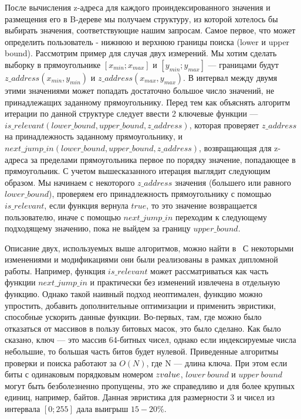 После вычисления z-адреса для каждого проиндексированного значения и размещения его в B-дереве мы получаем структуру, из которой хотелось бы выбирать значения, соответствующие нашим запросам. Самое первое, что может определить пользователь - нижнюю и верхнюю границы поиска (lower и upper bound). Рассмотрим пример для случая двух измерений. Мы хотим сделать выборку в прямоугольнике $[x_{min};x_{max}]$ и $[y_{min}; y_{max}]$ --- границами будут $z\_address(x_{min}, y_{min})$ и $z\_address(x_{max}, y_{max})$. В интервал между двумя этими значениями может попадать достаточно большое число значений, не принадлежащих заданному прямоугольнику. Перед тем как объяснять алгоритм итерации по данной структуре следует ввести 2 ключевые функции --- $is\_relevant(lower\_bound, upper\_bound, z\_address)$, которая проверяет $z\_address$ на принадлежность заданному прямоугольнику, и $next\_jump\_in(lower\_bound, upper\_bound, z\_address)$, возвращающая для z-адреса за пределами прямоугольника первое по порядку значение, попадающее в прямоугольник.
С учетом вышесказанного итерация выглядит следующим образом. Мы начинаем с некоторого $z\_address$ значения (большего или равного $lower\_bound$), проверяем его принадлежность прямоугольнику с помощью  $is\_relevant$, если функция вернула $true$, то это значение возвращается пользователю, иначе с помощью $next\_jump\_in$ переходим к следующему подходящему значению, пока не выйдем за границу $upper\_bound$.

Описание двух, используемых выше алгоритмов, можно найти в~\cite{ramsak2000integrating, widhopf2005advanced, prukl2007relavcni} С некоторыми изменениями и модификациями они были реализованы в рамках дипломной работы. Например, функция $is\_relevant$ может рассматриваться как часть функции $next\_jump\_in$ и практически без изменений извлечена в отдельную функцию. Однако такой наивный подход неоптимален, функцию можно упростить, добавить дополнительные оптимизации и применить эвристики, способные ускорить данные функции.
Во-первых, там, где можно было отказаться от массивов в пользу битовых масок, это было сделано.
Как было сказано, ключ --- это массив 64-битных чисел, однако если индексируемые числа небольшие, то большая часть битов будет нулевой.
Приведенные алгоритмы проверки и поиска работают за $O(N)$, где N ---
длина ключа. При этом если биты с одинаковым порядковым номером $z\-value$, $lower\ bound$ и $upper\ bound$ могут быть безболезненно
пропущены, это же справедливо и для более крупных единиц, например, байтов. Данная эвристика для размерности $3$ и чисел из интервала $[0; 255]$ дала выигрыш $15-20\%$.

